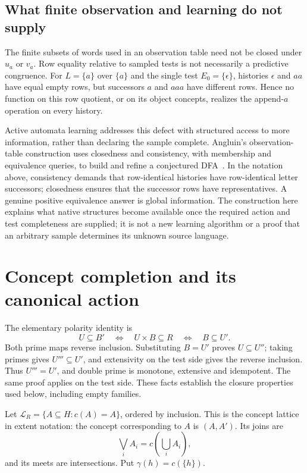 \documentclass[11pt]{article}
\theoremstyle{remark}
\begin{document}
\subsection{What finite observation and learning do not supply}
The finite subsets of words used in an observation table need not be
closed under $u_a$ or $v_a$. Row equality relative to sampled tests is not
necessarily a predictive congruence. For $L=\{a\}$ over $\{a\}$ and the
single test $E_0=\{\epsilon\}$, histories $\epsilon$ and $aa$ have equal
empty rows, but successors $a$ and $aaa$ have different rows. Hence no
function on this row quotient, or on its object concepts, realizes the
append-$a$ operation on every history.

Active automata learning addresses this defect with structured access to
more information, rather than declaring the sample complete. Angluin's
observation-table construction uses closedness and consistency, with
membership and equivalence queries, to build and refine a conjectured
DFA~\cite{cg:angluin}. In the notation above, consistency demands that
row-identical histories have row-identical letter successors; closedness
ensures that the successor rows have representatives. A genuine positive
equivalence answer is global information. The construction here explains
what native structures become available once the required action and test
completeness are supplied; it is not a new learning algorithm or a proof
that an arbitrary sample determines its unknown source language.
\section{Concept completion and its canonical action}


The elementary polarity identity is
\[
 U\subseteq B'\quad\Longleftrightarrow\quad U\times B\subseteq R
 \quad\Longleftrightarrow\quad B\subseteq U'.
\]
Both prime maps reverse inclusion. Substituting $B=U'$ proves
$U\subseteq U''$; taking primes gives $U'''\subseteq U'$, and
extensivity on the test side gives the reverse inclusion. Thus
$U'''=U'$, and double prime is monotone, extensive and idempotent.
The same proof applies on the test side. These facts establish the closure
properties used below, including empty families.

Let $\mathcal L_R=\{A\subseteq H:c(A)=A\}$, ordered by inclusion.
This is the concept lattice in extent notation: the concept corresponding
to $A$ is $(A,A')$. Its joins are
\[
 \bigvee_i A_i=c\left(\bigcup_i A_i\right),
\]
and its meets are intersections. Put $\gamma(h)=c(\{h\})$.
\end{document}
